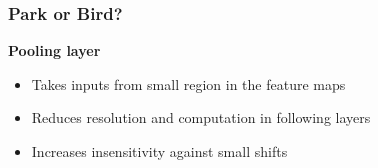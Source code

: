 \begin{frame}
  \frametitle{Park or Bird?}
    \begin{center}

        \textbf{Pooling layer}
        \begin{itemize}
          \item Takes inputs from small region in the feature maps
          \item Reduces resolution and computation in following layers
          \item Increases insensitivity against small shifts
        \end{itemize}

    \end{center}
\end{frame}

